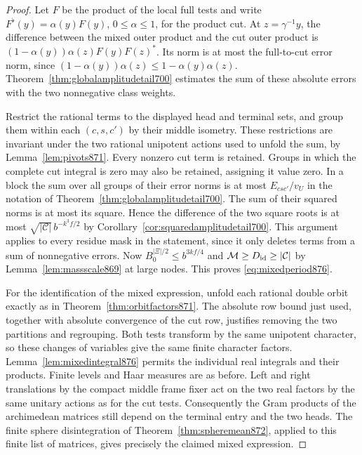 \documentclass[a4paper,11pt]{article}
\theoremstyle{definition}
\theoremstyle{remark}
\numberwithin{equation}{section}
\begin{document}
\begin{proof}
Let \(F\) be the product of the local full tests and write
\(F^\flat(y)=\alpha(y)F(y)\), \(0\le\alpha\le1\), for the
product cut. At \(z=\gamma^{-1}y\), the difference between the
mixed outer product and the cut outer product is
\((1-\alpha(y))\alpha(z)F(y)F(z)^*\).
Its norm is at most the full-to-cut error norm, since
\((1-\alpha(y))\alpha(z)\le1-\alpha(y)\alpha(z)\).
Theorem~\ref{thm:globalamplitudetail700} estimates the sum of
these absolute errors with the two nonnegative class weights.

Restrict the rational terms to the displayed head and terminal
sets, and group them within each \((c,s,c')\) by their middle
isometry. These restrictions are invariant under the two rational
unipotent actions used to unfold the sum, by
Lemma~\ref{lem:pivots871}. Every nonzero cut term is retained.
Groups in which the complete cut integral is zero may also be
retained, assigning it value zero. In a block the sum over all
groups of their error norms is at most \(E_{csc'}/v_U\) in the
notation of Theorem~\ref{thm:globalamplitudetail700}. The sum of
their squared norms is at most its square. Hence the difference
of the two square roots is at most
\(\sqrt{|\mathcal C|}\,b^{-k^3 f/2}\) by
Corollary~\ref{cor:squaredamplitudetail700}. This argument applies
to every residue mask in the statement, since it only deletes
terms from a sum of nonnegative errors.
Now \(B_0^{|\Xi|/2}\le b^{3kf/4}\) and
\(\mathcal M\ge D_{\rm id}\ge|\mathcal C|\) by
Lemma~\ref{lem:massscale869} at large nodes. This proves
\eqref{eq:mixedperiod876}.

For the identification of the mixed expression, unfold each
rational double orbit exactly as in Theorem~\ref{thm:orbitfactors871}.
The absolute row bound just used, together with absolute convergence
of the cut row, justifies removing the two partitions and regrouping.
Both tests transform by the same unipotent character, so these
changes of variables give the same finite character factors.
Lemma~\ref{lem:mixedintegral876} permits the individual real
integrals and their products. Finite levels and Haar measures are
as before. Left and right translations by the compact middle frame
fixer act on the two real factors by the same unitary actions
as for the cut tests. Consequently the Gram products of the
archimedean matrices still depend on the terminal entry and the
two heads. The finite sphere disintegration of
Theorem~\ref{thm:spheremean872}, applied to this finite list of
matrices, gives precisely the claimed mixed expression.
\end{proof}
\end{document}
